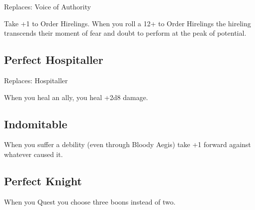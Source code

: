 Replaces: Voice of Authority

 

Take +1 to Order Hirelings. When you roll a 12+ to Order Hirelings the hireling transcends their moment of fear and doubt to perform at the peak of potential.

 
\subsection{Perfect Hospitaller}    
 

Replaces: Hospitaller

 

When you heal an ally, you heal +2d8 damage.

 
\subsection{Indomitable}   
 

When you suffer a debility (even through Bloody Aegis) take +1 forward against whatever caused it.

 
\subsection{Perfect Knight}    
 

When you Quest you choose three boons instead of two.









 
